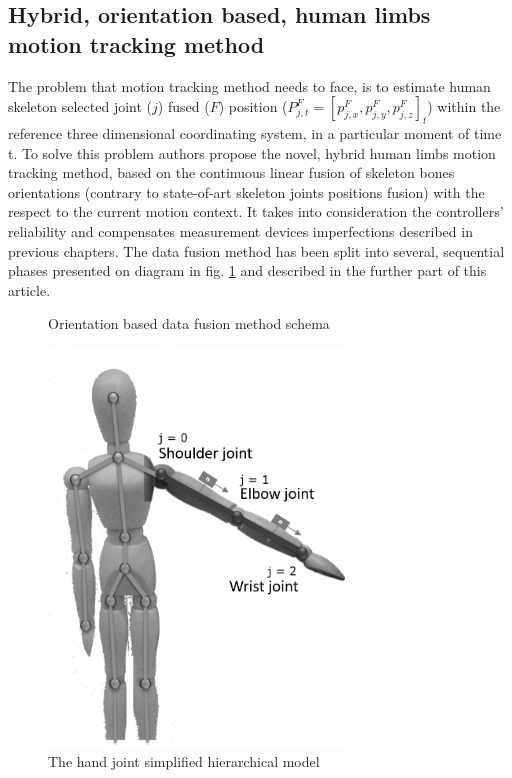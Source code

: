 \documentclass[sensors,article,submit,moreauthors,pdftex,10pt,a4paper]{mdpi}
\begin{document}
\subsection{Hybrid, orientation based, human limbs motion tracking method}
The problem that motion tracking method needs to face, is to estimate human skeleton selected joint ($j$) fused ($F$) position ($P^F_{j,t} = [p^F_{j,x}, p^F_{j,y}, p^F_{j,z}]_t$) within the reference three dimensional coordinating system, in a particular moment of time t. To solve this problem authors propose the novel, hybrid human limbs motion tracking method, based on the continuous linear fusion of skeleton bones orientations (contrary to state-of-art skeleton joints positions fusion) with the respect to the current motion context. It takes into consideration the controllers’ reliability and compensates measurement devices imperfections described in previous chapters. The data fusion method has been split into several, sequential phases presented on diagram in fig. \ref{fig:methodPhases} and described in the further part of this article. 
		
\begin{minipage}{\linewidth}
	\centering
	\begin{minipage}[b]{0.45\linewidth}
		\begin{figure}[H] %
			\scalebox{0.47}{
				
			}
			\caption{Orientation based data fusion method schema}
			\label{fig:methodPhases}
		\end{figure}
	\end{minipage}
	\hfill
	\begin{minipage}[b]{0.45\linewidth}
		\begin{figure}[H] %
			\includegraphics[width=0.7\textwidth]{Figure9.png}
			\caption{The hand joint simplified hierarchical model}		
			\label{fig:hybrid:jointsHierarchy}	
		\end{figure}
	\end{minipage}
\end{minipage}
		
\end{document}
